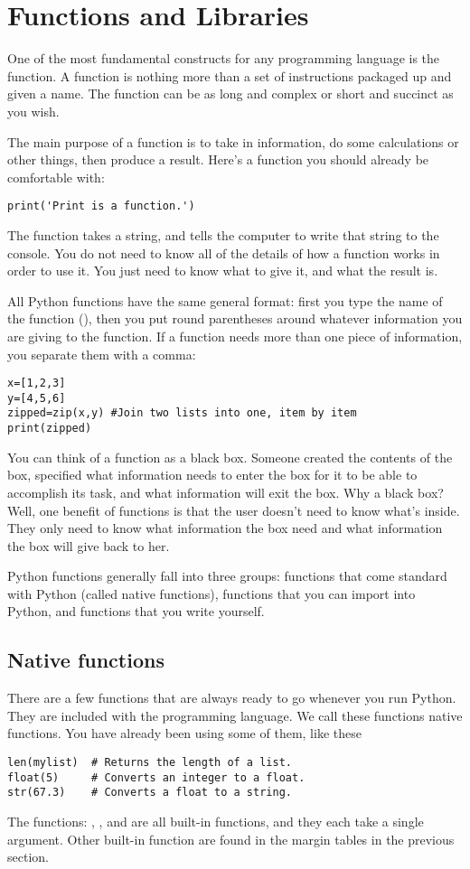 \chapter{Functions and Libraries}
\label{chap:Functions}

One of the most fundamental constructs for any programming language is
the function. A function is nothing more than a set of instructions
packaged up and given a name.  The function can be as long and complex
or short and succinct as you wish.

The main purpose of a function is to take in information, do some calculations or other things, then produce a result.  Here's a function you should already be comfortable with:
\begin{Verbatim}
print('Print is a function.')
\end{Verbatim}
The  function takes a string, and tells the computer to write that string to the console.  You do not need to know all of the details of how a function works in order to use it.  You just need to know what to give it, and what the result is.

All Python functions have the same general format: first you type the name of the function (), then you put round parentheses \code{()} around whatever information you are giving to the function.  If a function needs more than one piece of information, you separate them with a comma:
\begin{Verbatim}
x=[1,2,3]
y=[4,5,6]
zipped=zip(x,y) #Join two lists into one, item by item
print(zipped)
\end{Verbatim}

You can think of a function as a
black box. Someone created the contents of the box, specified what
information needs to enter the box for it to be able to accomplish
its task, and what information will exit the box.  Why a black box?
Well, one benefit of functions is that the user doesn't need to
know what's inside.  They only need to know what information the box
need and what information the box will give back to her.

Python functions generally fall into three groups: functions that come standard with Python (called native functions), functions that you can import into Python, and functions that you write yourself.

\section{Native functions}
There are a few functions that are always ready to go whenever you run Python. They are included with the
programming language.  We call these functions native
functions.  You have already been using some
of them, like these
\begin{Verbatim}
len(mylist)  # Returns the length of a list.
float(5)     # Converts an integer to a float.
str(67.3)    # Converts a float to a string.
\end{Verbatim}
The functions: , , and  are all
built-in functions, and they each take a single argument.  Other
built-in function are found in the margin tables in the previous section.






